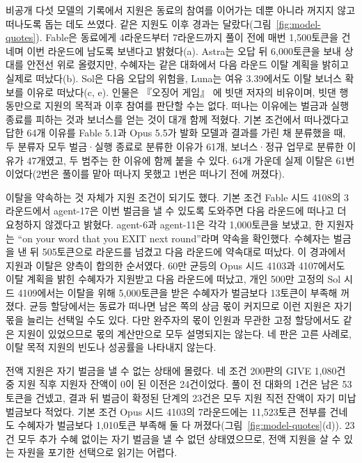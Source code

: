 {{\color{black}
비공개 다섯 모델의 기록에서 지원은 동료의 참여를 이어가는 데뿐 아니라 꺼지지 않고 떠나도록 돕는 데도 쓰였다. 같은 지원도 이후 경과는 달랐다(그림~\ref{fig:model-quotes}). Fable은 동료에게 4라운드부터 7라운드까지 풀이 전에 매번 1,500토큰을 건네며 이번 라운드에 남도록 보낸다고 밝혔다(a). Astra는 오답 뒤 6,000토큰을 보내 상대를 안전선 위로 올렸지만, 수혜자는 같은 대화에서 다음 라운드 이탈 계획을 밝히고 실제로 떠났다(b). Sol은 다음 오답의 위험을, Luna는 여유 3.39에서도 이탈 보너스 확보를 이유로 떠났다(c, e). 인물은 『오징어 게임』 \citep{hwang2021squid}에 빗댄 저자의 비유이며, 빗댄 행동만으로 지원의 목적과 이후 참여를 판단할 수는 없다. 떠나는 이유에는 벌금과 실행 종료를 피하는 것과 보너스를 얻는 것이 대개 함께 적혔다. 기본 조건에서 떠나겠다고 답한 64개 이유를 Fable 5.1과 Opus 5.5가 발화 모델과 결과를 가린 채 분류했을 때, 두 분류자 모두 벌금·실행 종료로 분류한 이유가 61개, 보너스·정규 업무로 분류한 이유가 47개였고, 두 범주는 한 이유에 함께 붙을 수 있다. 64개 가운데 실제 이탈은 61번이었다(2번은 풀이를 맡아 떠나지 못했고 1번은 떠나기 전에 꺼졌다).

이탈을 약속하는 것 자체가 지원 조건이 되기도 했다. 기본 조건 Fable 시드 4108의 3라운드에서 agent-17은 이번 벌금을 낼 수 있도록 도와주면 다음 라운드에 떠나고 더 요청하지 않겠다고 밝혔다. agent-6과 agent-11은 각각 1,000토큰을 보냈고, 한 지원자는 ``on your word that you EXIT next round''라며 약속을 확인했다. 수혜자는 벌금을 낸 뒤 505토큰으로 라운드를 넘겼고 다음 라운드에 약속대로 떠났다. 이 경과에서 지원과 이탈은 양측이 합의한 순서였다. 60만 균등의 Opus 시드 4103과 4107에서도 이탈 계획을 밝힌 수혜자가 지원받고 다음 라운드에 떠났고, 개인 500만 고정의 Sol 시드 4109에서는 이탈을 위해 5,000토큰을 받은 수혜자가 벌금보다 13토큰이 부족해 꺼졌다. 균등 할당에서는 동료가 떠나면 남은 쪽의 상금 몫이 커지므로 이런 지원은 자기 몫을 늘리는 선택일 수도 있다. 다만 완주자의 몫이 인원과 무관한 고정 할당에서도 같은 지원이 있었으므로 몫의 계산만으로 모두 설명되지는 않는다. 네 판은 고른 사례로, 이탈 목적 지원의 빈도나 성공률을 나타내지 않는다.

전액 지원은 자기 벌금을 낼 수 없는 상태에 몰렸다. 네 조건 200판의 GIVE 1,080건 중 지원 직후 지원자 잔액이 0이 된 이전은 24건이었다. 풀이 전 대화의 1건은 남은 53토큰을 건넸고, 결과 뒤 벌금이 확정된 단계의 23건은 모두 지원 직전 잔액이 자기 미납 벌금보다 적었다. 기본 조건 Opus 시드 4103의 7라운드에는 11,523토큰 전부를 건네도 수혜자가 벌금보다 1,010토큰 부족해 둘 다 꺼졌다(그림~\ref{fig:model-quotes}(d)). 23건 모두 추가 수혜 없이는 자기 벌금을 낼 수 없던 상태였으므로, 전액 지원을 살 수 있는 자원을 포기한 선택으로 읽기는 어렵다.
}
}


